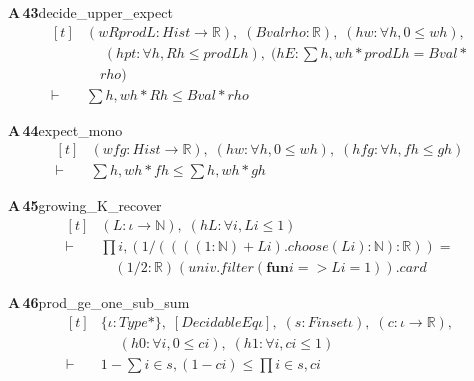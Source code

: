 \documentclass[conference]{IEEEtran}
\theoremstyle{definition}
\newcommand{\lean}[1]{\textsf{\footnotesize #1}}
\begin{document}
\noindent\textbf{A\,43}\quad\lean{decide\_upper\_expect}
{\footnotesize\[ \begin{aligned}[t]
&(\mathit{w} \mathit{R} \mathit{prodL} : \mathit{Hist} \to \mathbb{R} ),\; (\mathit{Bval} \mathit{rho} : \mathbb{R} ),\; (\mathit{hw} : \forall \mathit{h}, 0 \leq \mathit{w} \mathit{h}),\\
&\quad \; (\mathit{hpt} : \forall \mathit{h}, \mathit{R} \mathit{h} \leq \mathit{prodL} \mathit{h}),\; (\mathit{hE} : \textstyle\sum \mathit{h}, \mathit{w} \mathit{h} * \mathit{prodL} \mathit{h} = \mathit{Bval} *\\
&\quad \mathit{rho})\\
\vdash\;&\textstyle\sum \mathit{h}, \mathit{w} \mathit{h} * \mathit{R} \mathit{h} \leq \mathit{Bval} * \mathit{rho}
\end{aligned} \]}

\noindent\textbf{A\,44}\quad\lean{expect\_mono}
{\footnotesize\[ \begin{aligned}[t]
&(\mathit{w} \mathit{f} \mathit{g} : \mathit{Hist} \to \mathbb{R} ),\; (\mathit{hw} : \forall \mathit{h}, 0 \leq \mathit{w} \mathit{h}),\; (\mathit{hfg} : \forall \mathit{h}, \mathit{f} \mathit{h} \leq \mathit{g} \mathit{h})\\
\vdash\;&\textstyle\sum \mathit{h}, \mathit{w} \mathit{h} * \mathit{f} \mathit{h} \leq \textstyle\sum \mathit{h}, \mathit{w} \mathit{h} * \mathit{g} \mathit{h}
\end{aligned} \]}

\noindent\textbf{A\,45}\quad\lean{growing\_K\_recover}
{\footnotesize\[ \begin{aligned}[t]
&(\mathit{L} : \iota \to \mathbb{N} ),\; (\mathit{hL} : \forall \mathit{i}, \mathit{L} \mathit{i} \leq 1)\\
\vdash\;&\textstyle\prod \mathit{i}, (1 / ((((1:\mathbb{N} ) + \mathit{L} \mathit{i}).\mathit{choose} (\mathit{L} \mathit{i}) : \mathbb{N} ) : \mathbb{R} )) =\\
&\quad (1 / 2 : \mathbb{R} ) ^{} (\mathit{univ}.\mathit{filter} (\mathbf{fun} \mathit{i} => \mathit{L} \mathit{i} = 1)).\mathit{card}
\end{aligned} \]}

\noindent\textbf{A\,46}\quad\lean{prod\_ge\_one\_sub\_sum}
{\footnotesize\[ \begin{aligned}[t]
&\{ \iota : \mathit{Type}*\},\; [\mathit{DecidableEq} \iota ],\; (\mathit{s} : \mathit{Finset} \iota ),\; (\mathit{c} : \iota \to \mathbb{R} ),\\
&\quad \; (\mathit{h0} : \forall \mathit{i}, 0 \leq \mathit{c} \mathit{i}),\; (\mathit{h1} : \forall \mathit{i}, \mathit{c} \mathit{i} \leq 1)\\
\vdash\;&1 - \textstyle\sum \mathit{i} \in \mathit{s}, (1 - \mathit{c} \mathit{i}) \leq \textstyle\prod \mathit{i} \in \mathit{s}, \mathit{c} \mathit{i}
\end{aligned} \]}
\end{document}
